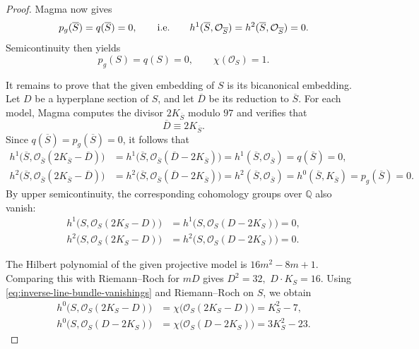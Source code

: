\documentclass[11pt,a4paper]{article}
\begin{document}
\begin{proof}
Magma now gives
$$
        p_g(\overline S)=q(\overline S)=0,
\qquad {\rm i.e.}\qquad 
h^1(\overline S,\mathcal O_{\overline S})=h^2(\overline S,\mathcal O_{\overline S})=0.
$$
Semicontinuity then yields
\[
        p_g(S)=q(S)=0,
        \qquad \chi(\mathcal O_S)=1.
\]

It remains to prove that the given embedding of $S$ is its bicanonical
embedding.  Let $D$ be a hyperplane section of $S$, and let
$\overline D$ be its reduction to $\overline S$.  For each model, Magma computes the divisor $2K_{\overline S}$ modulo
$97$ and verifies that
\[
        \overline D\equiv2K_{\overline S}.
\]
Since $q(\overline S)=p_g(\overline S)=0$, it follows that
\[
\begin{aligned}
 h^1\bigl(\overline S,
      \mathcal O_{\overline S}(2K_{\overline S}-\overline D)\bigr)
 &=h^1\bigl(\overline S,
      \mathcal O_{\overline S}(\overline D-2K_{\overline S})\bigr)
 =h^1(\overline S,\mathcal O_{\overline S})
 =q(\overline S)=0,\\
 h^2\bigl(\overline S,
      \mathcal O_{\overline S}(2K_{\overline S}-\overline D)\bigr)
 &=h^2\bigl(\overline S,
      \mathcal O_{\overline S}(\overline D-2K_{\overline S})\bigr)
 =h^2(\overline S,\mathcal O_{\overline S})
 =h^0(\overline S,K_{\overline S})
 =p_g(\overline S)=0.
\end{aligned}
\]
By upper semicontinuity, the corresponding cohomology groups over
$\mathbb Q$ also vanish:
\begin{equation}
\begin{aligned}
 h^1\bigl(S,\mathcal O_S(2K_S-D)\bigr)
 &=h^1\bigl(S,\mathcal O_S(D-2K_S)\bigr)=0,\\
 h^2\bigl(S,\mathcal O_S(2K_S-D)\bigr)
 &=h^2\bigl(S,\mathcal O_S(D-2K_S)\bigr)=0.
\end{aligned}
\label{eq:inverse-line-bundle-vanishings}
\end{equation}

The Hilbert polynomial of the given projective model is
\(
        16m^2-8m+1.
\)
Comparing this with Riemann--Roch for $mD$ gives
$D^2=32,$ $D\mathbin{\cdot}K_S=16$.
Using \eqref{eq:inverse-line-bundle-vanishings} and Riemann--Roch on $S$,
we obtain
\[
\begin{aligned}
 h^0\bigl(S,\mathcal O_S(2K_S-D)\bigr)
   &=\chi\bigl(\mathcal O_S(2K_S-D)\bigr)
     =K_S^2-7,\\
 h^0\bigl(S,\mathcal O_S(D-2K_S)\bigr)
   &=\chi\bigl(\mathcal O_S(D-2K_S)\bigr)
     =3K_S^2-23.
\end{aligned}
\]


\end{proof}
\end{document}
